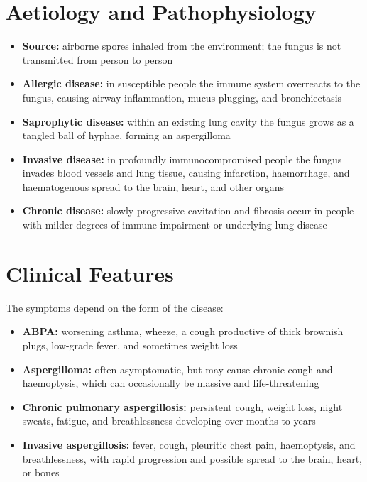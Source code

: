 \section*{Aetiology and Pathophysiology}
\begin{itemize}
    \item \textbf{Source:} airborne spores inhaled from the environment; the fungus is not transmitted from person to person
    \item \textbf{Allergic disease:} in susceptible people the immune system overreacts to the fungus, causing airway inflammation, mucus plugging, and bronchiectasis
    \item \textbf{Saprophytic disease:} within an existing lung cavity the fungus grows as a tangled ball of hyphae, forming an aspergilloma
    \item \textbf{Invasive disease:} in profoundly immunocompromised people the fungus invades blood vessels and lung tissue, causing infarction, haemorrhage, and haematogenous spread to the brain, heart, and other organs
    \item \textbf{Chronic disease:} slowly progressive cavitation and fibrosis occur in people with milder degrees of immune impairment or underlying lung disease
\end{itemize}

\section*{Clinical Features}
The symptoms depend on the form of the disease:
\begin{itemize}
    \item \textbf{ABPA:} worsening asthma, wheeze, a cough productive of thick brownish plugs, low-grade fever, and sometimes weight loss
    \item \textbf{Aspergilloma:} often asymptomatic, but may cause chronic cough and haemoptysis, which can occasionally be massive and life-threatening
    \item \textbf{Chronic pulmonary aspergillosis:} persistent cough, weight loss, night sweats, fatigue, and breathlessness developing over months to years
    \item \textbf{Invasive aspergillosis:} fever, cough, pleuritic chest pain, haemoptysis, and breathlessness, with rapid progression and possible spread to the brain, heart, or bones
\end{itemize}

